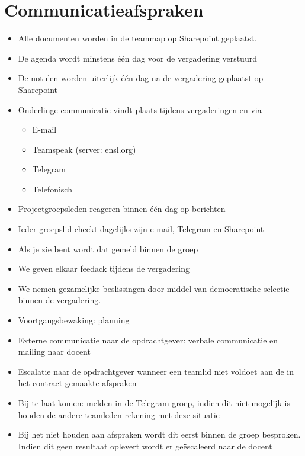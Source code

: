 \documentclass[dutch]{hu}
\begin{document}
\chapter{Communicatieafspraken}
\begin{itemize}
	\item Alle documenten worden in de teammap op Sharepoint geplaatst.
	\item De agenda wordt minstens één dag voor de vergadering verstuurd
	\item De notulen worden uiterlijk één dag na de vergadering geplaatst op Sharepoint
	\item Onderlinge communicatie vindt plaats tijdens vergaderingen en via 
		\begin{itemize}
		\item E-mail
		\item Teamspeak (server: ensl.org)
		\item Telegram
		\item Telefonisch
		\end{itemize}
	\item Projectgroepsleden reageren binnen één dag op berichten
	\item Ieder groepslid checkt dagelijks zijn e-mail, Telegram en Sharepoint
	\item Als je zie bent wordt dat gemeld binnen de groep
	\item We geven elkaar feedack tijdens de vergadering
	\item We nemen gezamelijke beslissingen door middel van democratische selectie binnen de vergadering.
	\item Voortgangsbewaking: planning
	\item Externe communicatie naar de opdrachtgever: verbale communicatie en mailing naar docent
	\item Escalatie naar de opdrachtgever wanneer een teamlid niet voldoet aan  de in het contract gemaakte afspraken
	\item Bij te laat komen: melden in de Telegram groep, indien dit niet mogelijk is houden de andere teamleden rekening met deze situatie
	\item Bij het niet houden aan afspraken wordt dit eerst binnen de groep besproken. Indien dit geen resultaat oplevert wordt er geëscaleerd naar de docent

\end{itemize}
\end{document}
